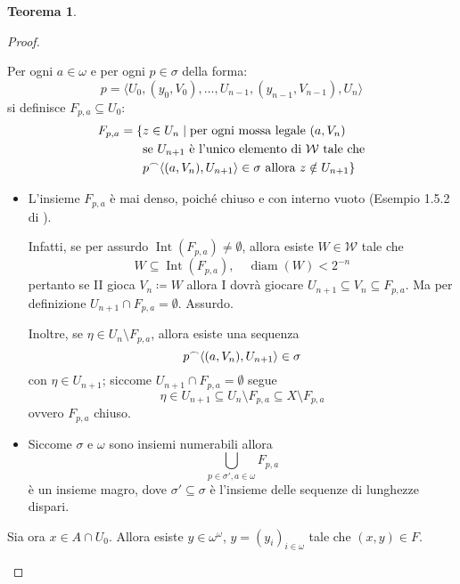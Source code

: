\documentclass[titlepage]{article}
\newcommand{\1}{\mathds{1}}
\newcommand{\concat}{\null^{\frown}} %
\theoremstyle{definition}%
\newtheorem{thm}{Teorema}[section]
\theoremstyle{plain}
\theoremstyle{remark}
\begin{document}
\begin{thm}
\begin{proof}
\begin{enumerate}
Per ogni \(a \in \omega\) e per ogni \(p \in \sigma\) della forma:
\begin{equation*}
 p=\langle
 	U_{0},({y}_{0}, V_{0}), \dots, U_{n-1}, ({y}_{n-1}, V_{n-1}), U_{n}
 \rangle
\end{equation*}
si definisce \(F_{p,a} \subseteq U_{0}\):
\begin{align*}
 F_{p,a} = \{&z \in U_{n}\mid \text{per ogni mossa legale }(a, V_{n})\\
 &\text{se } U_{n+1}\text{ è l'unico elemento di }\mathcal{W}\text{ tale che}\\
 &p \concat \langle(a,V_{n}), U_{n+1}\rangle \in \sigma \text{ allora } z \notin U_{n+1}\}
\end{align*}
\begin{itemize}
\item L'insieme \(F_{p,a}\) è mai denso, poiché chiuso e con interno vuoto (Esempio 1.5.2 di \cite{lmr}).

Infatti, se per assurdo \(\operatorname{Int}(F_{p,a}) \neq \emptyset\), allora esiste \(W \in \mathcal{W}\) tale che
\begin{equation*}
   W \subseteq \operatorname{Int}(F_{p,a}), \quad \operatorname{diam}(W)<2^{-n}
\end{equation*}
pertanto se II gioca \(V_{n} \coloneqq W\) allora I dovrà giocare \(U_{n+1} \subseteq V_{n} \subseteq F_{p,a}\). Ma per definizione \(U_{n+1}\cap F_{p,a} = \emptyset\). Assurdo.

Inoltre, se \(\eta \in U_{n}\setminus F_{p,a}\), allora esiste una sequenza
\begin{equation*}
   p\concat\langle (a,V_{n}), U_{n+1}\rangle \in \sigma
\end{equation*}
con \(\eta \in U_{n+1}\); siccome \(U_{n+1} \cap F_{p,a} = \emptyset\) segue
\begin{equation*}
   \eta \in U_{n+1} \subseteq U_{n}\setminus F_{p,a} \subseteq X\setminus F_{p,a}
\end{equation*}
ovvero \(F_{p,a}\) chiuso.

\item Siccome \(\sigma\) e \(\omega\) sono insiemi numerabili allora
\begin{equation*}
   \bigcup_{p \in \sigma', a \in \omega} F_{p,a}
\end{equation*}
è un insieme magro, dove \(\sigma' \subseteq \sigma\) è l'insieme delle sequenze di lunghezze dispari.
\end{itemize}

Sia ora \(x \in A\cap U_{0}\). Allora esiste \(y \in \omega^{\omega}\), \(y=(y_{i})_{i \in\omega}\) tale che \((x,y) \in F\).


\end{enumerate}
\end{proof}
\end{thm}
\end{document}
